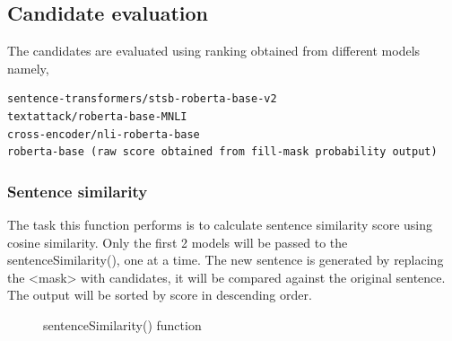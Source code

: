 \documentclass[12pt,oneside,openright,a4paper]{cpe-english-project}
\begin{document}
\subsection{Candidate evaluation}

The candidates are evaluated using ranking obtained from different models namely, 
\begin{verbatim}
sentence-transformers/stsb-roberta-base-v2 
textattack/roberta-base-MNLI
cross-encoder/nli-roberta-base
roberta-base (raw score obtained from fill-mask probability output)

\end{verbatim}



\subsubsection{Sentence similarity }
The task this function performs is to calculate sentence similarity score using cosine similarity. Only the first 2 models will be passed to the sentenceSimilarity(), one at a time. The new sentence is generated by replacing the <mask> with candidates, it will be compared against the original sentence. The output will be sorted by score in descending order.
\begin{figure}[!h]\centering
\setlength{\fboxrule}{0.2mm} %
\setlength{\fboxsep}{1cm}
\caption{sentenceSimilarity() function}\label{fig:sentenceSimilarity() function}
\end{figure}
\end{document}
